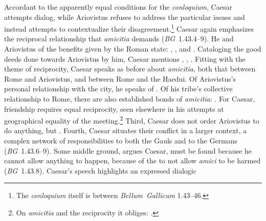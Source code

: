 \documentclass[12pt,letterpaper,oneside,final]{memoir}
\begin{document}
Accordant to the apparently equal conditions for the \emph{conloquium}, Caesar attempts dialog, while Ariovistus refuses to address the particular issues and instead attempts to contextualize their disagreement.\footnote{The \emph{conloquium} itself is between \emph{Bellum~Gallicum} 1.43--46.} Caesar again emphasizes the reciprocal relationship that \emph{amicitia} demands (\emph{BG}~1.43.4--9). He  and  Ariovistus of the benefits given by the Roman state: , , and . Cataloging the good deeds done towards Ariovistus by him, Caesar mentions , , . Fitting with the theme of reciprocity, Caesar speaks as before about \emph{amicitia}, both that between Rome and Ariovistus, and between Rome and the Haedui. Of Ariovistus's personal relationship with the city, he speaks of . Of his tribe's collective relationship to Rome, there are also established bonds of \emph{amicitia}: . For Caesar, friendship requires equal reciprocity, seen elsewhere in his attempts at geographical equality of the meeting.\footnote{On \emph{amicitia} and the reciprocity it obliges: .} Third, Caesar does not order Ariovistus to do anything, but . Fourth, Caesar situates their conflict in a larger context, a complex network of responsibilities to both the Gauls and to the Germans (\emph{BG}~1.43.6--9). Some middle ground, argues Caesar, must be found because he cannot allow anything to happen, because of the  to not allow \emph{amici} to be harmed (\emph{BG}~1.43.8). Caesar's speech highlights an expressed dialogic 
\end{document}
